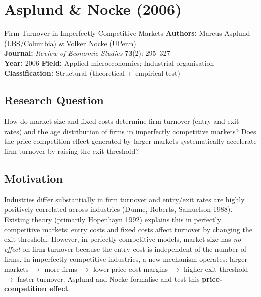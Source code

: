 \chapter{Asplund \& Nocke (2006)}

\begin{paperbox}{Firm Turnover in Imperfectly Competitive Markets}
\textbf{Authors:} Marcus Asplund (LBS/Columbia) \& Volker Nocke (UPenn)\\[3pt]
\textbf{Journal:} \textit{Review of Economic Studies} 73(2): 295--327\\[3pt]
\textbf{Year:} 2006 \quad\textbf{Field:} Applied microeconomics; Industrial
organisation\\[3pt]
\textbf{Classification:} Structural (theoretical + empirical test)
\end{paperbox}

\section{Research Question}

How do market size and fixed costs determine firm turnover (entry and exit
rates) and the age distribution of firms in imperfectly competitive markets?
Does the price-competition effect generated by larger markets systematically
accelerate firm turnover by raising the exit threshold?

\section{Motivation}

Industries differ substantially in firm turnover and entry/exit rates are
highly positively correlated across industries (Dunne, Roberts, Samuelson
1988). Existing theory (primarily Hopenhayn 1992) explains this in perfectly
competitive markets: entry costs and fixed costs affect turnover by changing
the exit threshold. However, in perfectly competitive models, market size has
\emph{no effect} on firm turnover because the entry cost is independent of the
number of firms. In imperfectly competitive industries, a new mechanism
operates: larger markets $\to$ more firms $\to$ lower price-cost margins $\to$
higher exit threshold $\to$ faster turnover. Asplund and Nocke formalise and
test this \textbf{price-competition effect}.


